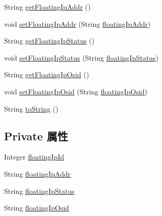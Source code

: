 \begin{DoxyCompactItemize}
\item 
String \mbox{\hyperlink{classcom_1_1example_1_1demo_1_1modular_1_1_floating_ip_a60f41c3771c93dca32640c4d2544c7c6}{get\+Floating\+Ip\+Addr}} ()
\item 
void \mbox{\hyperlink{classcom_1_1example_1_1demo_1_1modular_1_1_floating_ip_a7e830e1ea8b944b43c9b4fe736800558}{set\+Floating\+Ip\+Addr}} (String \mbox{\hyperlink{classcom_1_1example_1_1demo_1_1modular_1_1_floating_ip_a99d3efa58c7e2ac361388361e44bd308}{floating\+Ip\+Addr}})
\item 
String \mbox{\hyperlink{classcom_1_1example_1_1demo_1_1modular_1_1_floating_ip_a6c20137b77cf74e81e6af032c9f78054}{get\+Floating\+Ip\+Status}} ()
\item 
void \mbox{\hyperlink{classcom_1_1example_1_1demo_1_1modular_1_1_floating_ip_a8d3bac3dbabe6bc6ca111311644e6e06}{set\+Floating\+Ip\+Status}} (String \mbox{\hyperlink{classcom_1_1example_1_1demo_1_1modular_1_1_floating_ip_a5775e23db8a5f08b9ea99ca9ed55be12}{floating\+Ip\+Status}})
\item 
String \mbox{\hyperlink{classcom_1_1example_1_1demo_1_1modular_1_1_floating_ip_af9853194ce379cede7c8992e4e8e6c5a}{get\+Floating\+Ip\+Osid}} ()
\item 
void \mbox{\hyperlink{classcom_1_1example_1_1demo_1_1modular_1_1_floating_ip_a81de5afcd6a7b481f5b05af9e1b32713}{set\+Floating\+Ip\+Osid}} (String \mbox{\hyperlink{classcom_1_1example_1_1demo_1_1modular_1_1_floating_ip_a5e0179c3c33d52c9ccc8cba31bca659d}{floating\+Ip\+Osid}})
\item 
String \mbox{\hyperlink{classcom_1_1example_1_1demo_1_1modular_1_1_floating_ip_a2d1cb68e7a249210346e57d3fedd9c7d}{to\+String}} ()
\end{DoxyCompactItemize}
\subsection*{Private 属性}
\begin{DoxyCompactItemize}
\item 
Integer \mbox{\hyperlink{classcom_1_1example_1_1demo_1_1modular_1_1_floating_ip_aa2c129cf0eb591fe4e1c3b461d7edb31}{floating\+Ip\+Id}}
\item 
String \mbox{\hyperlink{classcom_1_1example_1_1demo_1_1modular_1_1_floating_ip_a99d3efa58c7e2ac361388361e44bd308}{floating\+Ip\+Addr}}
\item 
String \mbox{\hyperlink{classcom_1_1example_1_1demo_1_1modular_1_1_floating_ip_a5775e23db8a5f08b9ea99ca9ed55be12}{floating\+Ip\+Status}}
\item 
String \mbox{\hyperlink{classcom_1_1example_1_1demo_1_1modular_1_1_floating_ip_a5e0179c3c33d52c9ccc8cba31bca659d}{floating\+Ip\+Osid}}
\end{DoxyCompactItemize}


